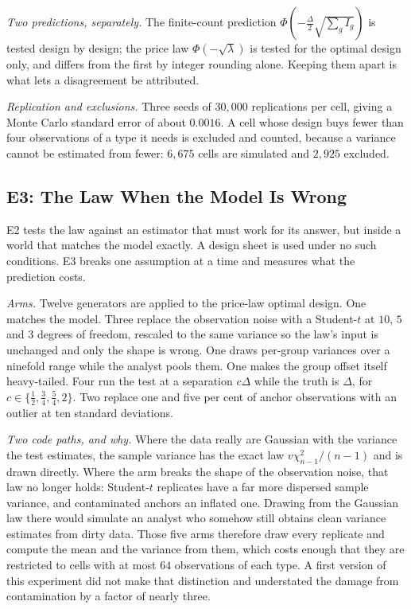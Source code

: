 \emph{Two predictions, separately.} The finite-count prediction
$\Phi(-\tfrac{\Delta}{2}\sqrt{\textstyle\sum_{g}I_{g}})$ is tested design by design; the
price law $\Phi(-\sqrt{\lambda})$ is tested for the optimal design only, and differs from
the first by integer rounding alone. Keeping them apart is what lets a disagreement be
attributed.

\emph{Replication and exclusions.} Three seeds of $30{,}000$ replications per cell, giving a
Monte Carlo standard error of about $0.0016$. A cell whose design buys fewer than four
observations of a type it needs is excluded and counted, because a variance cannot be
estimated from fewer: $6{,}675$ cells are simulated and $2{,}925$ excluded.

\subsection{E3: The Law When the Model Is Wrong}
\label{sec:e3}

E2 tests the law against an estimator that must work for its answer, but inside a world that
matches the model exactly. A design sheet is used under no such conditions. E3 breaks one
assumption at a time and measures what the prediction costs.

\emph{Arms.} Twelve generators are applied to the price-law optimal design. One matches the
model. Three replace the observation noise with a Student-$t$ at $10$, $5$ and $3$ degrees of
freedom, rescaled to the same variance so the law's input is unchanged and only the shape is
wrong. One draws per-group variances over a ninefold range while the analyst pools them. One
makes the group offset itself heavy-tailed. Four run the test at a separation
$c\Delta$ while the truth is $\Delta$, for $c\in\{\tfrac12,\tfrac34,\tfrac54,2\}$. Two
replace one and five per cent of anchor observations with an outlier at ten standard
deviations.

\emph{Two code paths, and why.} Where the data really are Gaussian with the variance the test
estimates, the sample variance has the exact law $v\chi^{2}_{n-1}/(n-1)$ and is drawn
directly. Where the arm breaks the shape of the observation noise, that law no longer holds:
Student-$t$ replicates have a far more dispersed sample variance, and contaminated anchors an
inflated one. Drawing from the Gaussian law there would simulate an analyst who somehow still
obtains clean variance estimates from dirty data. Those five arms therefore draw every
replicate and compute the mean and the variance from them, which costs enough that they are
restricted to cells with at most $64$ observations of each type. A first version of this
experiment did not make that distinction and understated the damage from contamination by a
factor of nearly three.

